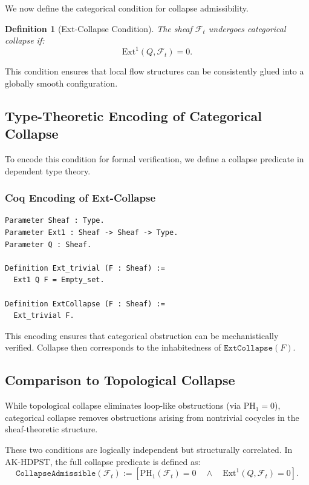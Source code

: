 \documentclass[11pt]{article}
\newtheorem{definition}[theorem]{Definition}
\begin{document}
We now define the categorical condition for collapse admissibility.

\begin{definition}[Ext-Collapse Condition]
The sheaf \( \mathcal{F}_t \) undergoes categorical collapse if:
\[
\mathrm{Ext}^1(Q, \mathcal{F}_t) = 0.
\]
\end{definition}

This condition ensures that local flow structures can be consistently glued into a globally smooth configuration.

\subsection{Type-Theoretic Encoding of Categorical Collapse}

To encode this condition for formal verification, we define a collapse predicate in dependent type theory.

\subsubsection*{Coq Encoding of Ext-Collapse}
\begin{lstlisting}
Parameter Sheaf : Type.
Parameter Ext1 : Sheaf -> Sheaf -> Type.
Parameter Q : Sheaf.

Definition Ext_trivial (F : Sheaf) :=
  Ext1 Q F = Empty_set.

Definition ExtCollapse (F : Sheaf) :=
  Ext_trivial F.
\end{lstlisting}

This encoding ensures that categorical obstruction can be mechanistically verified. Collapse then corresponds to the inhabitedness of \( \texttt{ExtCollapse}(F) \).

\subsection{Comparison to Topological Collapse}

While topological collapse eliminates loop-like obstructions (via \( \mathrm{PH}_1 = 0 \)), categorical collapse removes obstructions arising from nontrivial cocycles in the sheaf-theoretic structure.

These two conditions are logically independent but structurally correlated. In AK-HDPST, the full collapse predicate is defined as:
\begin{equation}
\texttt{CollapseAdmissible}(\mathcal{F}_t) := \left[
\mathrm{PH}_1(\mathcal{F}_t) = 0 \quad \wedge \quad \mathrm{Ext}^1(Q, \mathcal{F}_t) = 0
\right].
\end{equation}
\end{document}
